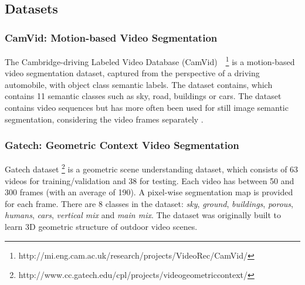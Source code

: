 \subsection{Datasets}\label{sec:deconvLSTM_datasets}
\subsubsection{CamVid: Motion-based Video Segmentation}
The Cambridge-driving Labeled Video Database (CamVid)~\cite{
Brostow2010semantic}~\footnote{http://mi.eng.cam.ac.uk/research/projects/VideoRec/CamVid/}
is a motion-based video segmentation dataset, captured
from the perspective of a driving automobile, with object class semantic
labels. The dataset contains, which contains 11 semantic classes such as sky,
road, buildings or cars. The dataset contains video sequences but has more
often been used for still image semantic segmentation, considering the video
frames separately \cite{}.

\subsubsection{Gatech: Geometric Context Video Segmentation}
\label{sssec:gatech}
Gatech dataset
\footnote{http://www.cc.gatech.edu/cpl/projects/videogeometriccontext/}
\cite{VideoGeometricContext2013} is a geometric scene understanding dataset,
which consists of 63 videos for training/validation and 38 for testing. Each
video has between 50 and 300 frames (with an average of 190). A pixel-wise
segmentation map is provided for each frame. There are 8 classes in the
dataset: \textit{sky}, \textit{ground}, \textit{buildings}, \textit{porous},
\textit{humans}, \textit{cars}, \textit{vertical mix} and \textit{main mix}.
The dataset was originally built to learn 3D geometric structure of outdoor
video scenes.



